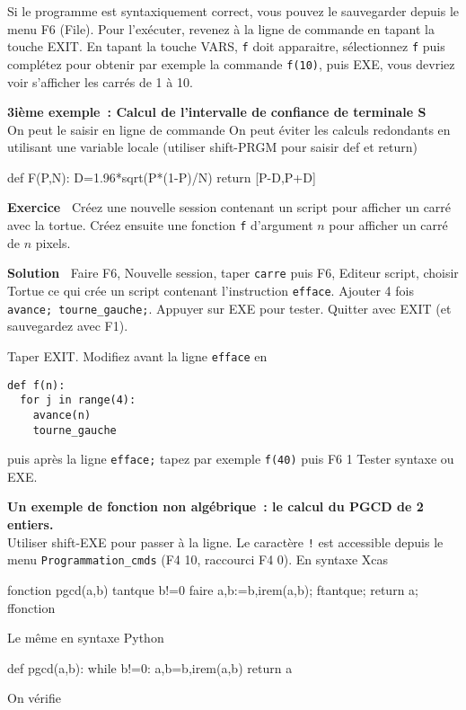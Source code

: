 \documentclass{article}
\begin{document}
\begin{giacjshere}
Si le programme est syntaxiquement correct, vous pouvez le sauvegarder
depuis le menu F6 (File). Pour l'ex\'ecuter, revenez \`a la
ligne de commande en tapant la touche EXIT. En tapant la touche
VARS, \verb|f| doit apparaitre, s\'electionnez \verb|f|
puis compl\'etez pour obtenir par
exemple la commande \verb|f(10)|, puis EXE, vous devriez voir s'afficher
les carr\'es de 1 \`a 10.


{\bf 3i\`eme exemple~: Calcul de l'intervalle de confiance de terminale S}\\
On peut le saisir en ligne de commande
On peut \'eviter les calculs redondants en utilisant une variable
locale (utiliser shift-PRGM pour saisir def et return)\\
\begin{giacprog}
def F(P,N):
  D=1.96*sqrt(P*(1-P)/N)
  return [P-D,P+D]
\end{giacprog}

{\bf Exercice~} Cr\'eez une nouvelle session  contenant
un script pour afficher un carr\'e avec la tortue.
Cr\'eez ensuite une fonction \verb|f| d'argument $n$
pour afficher un carr\'e de $n$ pixels.

{\bf Solution~}
Faire F6, Nouvelle session, taper \verb|carre| puis F6, Editeur script,
choisir Tortue ce qui cr\'ee un script contenant
l'instruction \verb|efface|. Ajouter 4 fois \verb|avance; tourne_gauche;|.
Appuyer sur EXE pour tester.
Quitter avec EXIT (et sauvegardez avec F1).

Taper EXIT. Modifiez avant la ligne \verb|efface| en
\begin{verbatim}
def f(n):
  for j in range(4):
    avance(n)
    tourne_gauche
\end{verbatim}
puis apr\`es la ligne \verb|efface;| tapez par exemple \verb|f(40)|
puis F6 1 Tester syntaxe ou EXE.

{\bf Un exemple de fonction non alg\'ebrique~: le calcul du PGCD de 2 entiers.}\\
Utiliser shift-EXE pour passer \`a la ligne. Le caract\`ere \verb|!|
est accessible depuis le menu \verb|Programmation_cmds| (F4 10, 
raccourci F4 0).
En syntaxe Xcas 
\begin{giacprog}
fonction pgcd(a,b)
  tantque b!=0 faire
    a,b:=b,irem(a,b);
  ftantque;
  return a;
ffonction
\end{giacprog}
Le m\^eme en syntaxe Python 
\begin{giacprog}
def pgcd(a,b):
  while b!=0:
    a,b=b,irem(a,b)
  return a
\end{giacprog}
On v\'erifie 


\end{giacjshere}
\end{document}
